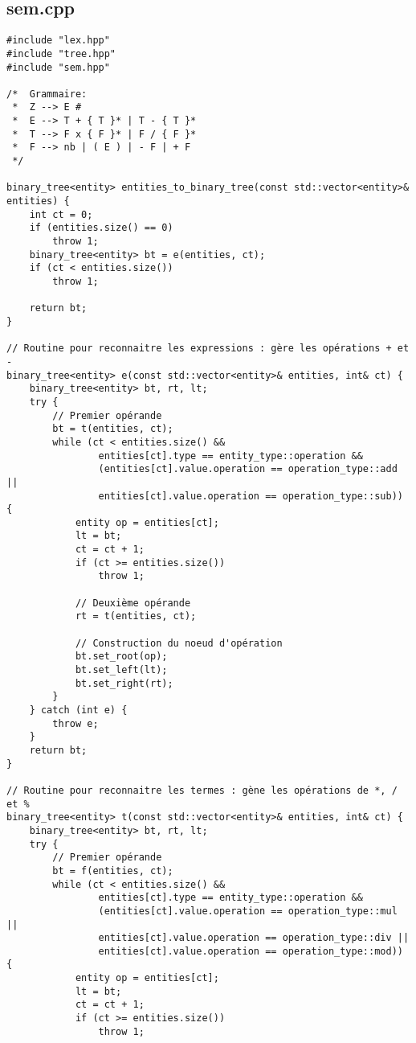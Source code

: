 \subsection{sem.cpp}
\begin{verbatim}
#include "lex.hpp"
#include "tree.hpp"
#include "sem.hpp"

/*  Grammaire:
 *  Z --> E #
 *  E --> T + { T }* | T - { T }*
 *  T --> F x { F }* | F / { F }*
 *  F --> nb | ( E ) | - F | + F
 */

binary_tree<entity> entities_to_binary_tree(const std::vector<entity>& entities) {
    int ct = 0;
    if (entities.size() == 0) 
        throw 1;
    binary_tree<entity> bt = e(entities, ct);
    if (ct < entities.size())
        throw 1;

    return bt;
}

// Routine pour reconnaitre les expressions : gère les opérations + et -
binary_tree<entity> e(const std::vector<entity>& entities, int& ct) {
    binary_tree<entity> bt, rt, lt;
    try {
        // Premier opérande
        bt = t(entities, ct);
        while (ct < entities.size() && 
                entities[ct].type == entity_type::operation &&
                (entities[ct].value.operation == operation_type::add ||
                entities[ct].value.operation == operation_type::sub)) {
            entity op = entities[ct];
            lt = bt;
            ct = ct + 1;
            if (ct >= entities.size())
                throw 1;

            // Deuxième opérande
            rt = t(entities, ct);

            // Construction du noeud d'opération
            bt.set_root(op);
            bt.set_left(lt);
            bt.set_right(rt);
        }
    } catch (int e) {
        throw e;
    }
    return bt;
}

// Routine pour reconnaitre les termes : gène les opérations de *, / et %
binary_tree<entity> t(const std::vector<entity>& entities, int& ct) {
    binary_tree<entity> bt, rt, lt;
    try {
        // Premier opérande
        bt = f(entities, ct);
        while (ct < entities.size() &&
                entities[ct].type == entity_type::operation &&
                (entities[ct].value.operation == operation_type::mul ||
                entities[ct].value.operation == operation_type::div ||
                entities[ct].value.operation == operation_type::mod)) {
            entity op = entities[ct];
            lt = bt;
            ct = ct + 1;
            if (ct >= entities.size())
                throw 1;


\end{verbatim}
